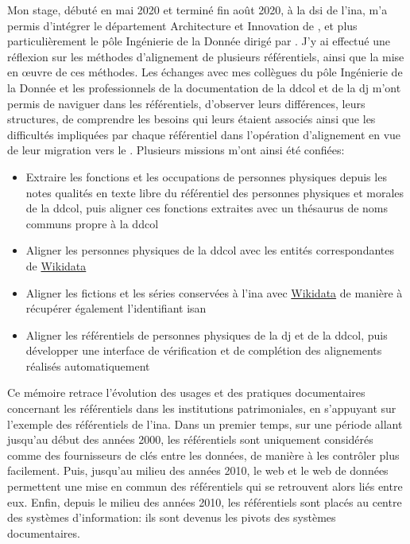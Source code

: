 Mon stage, débuté en mai 2020 et terminé fin août 2020, à la \ac{dsi} de l'\ac{ina}, m'a permis d'intégrer le département \og Architecture et Innovation\fg{} de , et plus particulièrement le pôle \og Ingénierie de la Donnée\fg{} dirigé par . J'y ai effectué une réflexion sur les méthodes d'alignement de plusieurs référentiels, ainsi que la mise en œuvre de ces méthodes. Les échanges avec mes collègues du pôle \og Ingénierie de la Donnée\fg{} et les professionnels de la documentation de la \ac{ddcol} et de la \ac{dj} m'ont permis de naviguer dans les référentiels, d'observer leurs différences, leurs structures, de comprendre les besoins qui leurs étaient associés ainsi que les difficultés impliquées par chaque référentiel dans l'opération d'alignement en vue de leur migration vers le \ldd. Plusieurs missions m'ont ainsi été confiées:
\begin{itemize}
	\item Extraire les fonctions et les occupations de personnes physiques depuis les notes qualités en texte libre du référentiel des personnes physiques et morales de la \ac{ddcol}, puis aligner ces fonctions extraites avec un thésaurus de noms communs propre à la \ac{ddcol}
	\item Aligner les personnes physiques de la \ac{ddcol} avec les entités correspondantes de \href{https://www.wikidata.org/}{Wikidata}
	\item Aligner les fictions et les séries conservées à l'\ac{ina} avec \href{https://www.wikidata.org/}{Wikidata} de manière à récupérer également l'identifiant \ac{isan}
	\item Aligner les référentiels de personnes physiques de la \ac{dj} et de la \ac{ddcol}, puis développer une interface de vérification et de complétion des alignements réalisés automatiquement
\end{itemize}
\bigskip

Ce mémoire retrace l'évolution des usages et des pratiques documentaires concernant les référentiels dans les institutions patrimoniales, en s'appuyant sur l'exemple des référentiels de l'\ac{ina}. Dans un premier temps, sur une période allant jusqu'au début des années 2000, les référentiels sont uniquement considérés comme des fournisseurs de clés entre les données, de manière à les contrôler plus facilement. Puis, jusqu'au milieu des années 2010, le web et le web de données permettent une mise en commun des référentiels qui se retrouvent alors liés entre eux. Enfin, depuis le milieu des années 2010, les référentiels sont placés au centre des systèmes d'information: ils sont devenus les pivots des systèmes documentaires.


\thispagestyle{empty}
\cleardoublepage